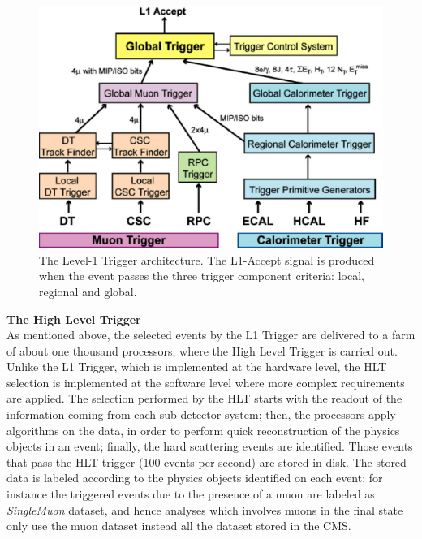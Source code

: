 \begin{center}
\begin{figure}[h]
\centering
\includegraphics[scale=0.35]{figuras/Chapter2/trigger}
\caption{The Level-1 Trigger architecture. The L1-Accept signal is produced when 
the event passes the three trigger component criteria: local, regional and global.}\label{figchp2:TriggerSystem}
\end{figure}
\end{center}

\textbf{The High Level Trigger}\\

\noindent As mentioned above, the selected events by 
the L1 Trigger are delivered to a farm of about one thousand 
processors, where the High Level Trigger is carried out. Unlike 
the L1 Trigger, which is implemented at the hardware level, the 
HLT selection is implemented at the software level where more 
complex requirements are applied. The selection performed by the HLT starts with the readout of the 
information coming from each sub-detector system; then, the
processors apply algorithms on the data, in order to perform quick 
reconstruction of the physics objects in an event; finally, the
hard scattering events are identified. Those events that pass 
the HLT trigger (100 events per second) are stored in disk. The stored data 
is labeled according to the physics objects 
identified on each event; for instance the triggered events due to the presence of a muon are 
labeled as \textit{SingleMuon} dataset, and hence analyses which involves muons in the final state 
only use  the muon dataset instead all the dataset stored in the CMS.



